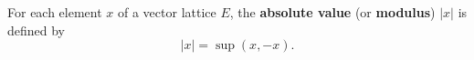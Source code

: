 For each element $x$ of a vector lattice $E$, the \textbf{absolute value} (or \textbf{modulus}) $|x|$ is defined by
$$|x| = \sup(x, -x).$$
